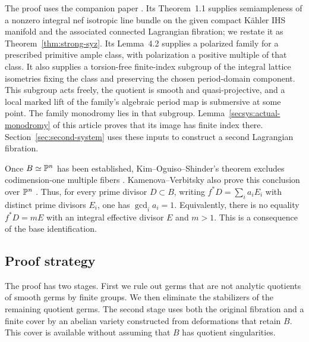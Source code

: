 The proof uses the companion paper \cite{StrongSYZ2026}.
Its Theorem~1.1 supplies semiampleness of a nonzero
integral nef isotropic line bundle on the given compact Kähler IHS manifold
and the associated connected Lagrangian fibration; we restate it as
Theorem~\ref{thm:strong-syz}. Its Lemma~4.2 supplies a polarized family for
a prescribed primitive ample class, with polarization a positive multiple
of that class. It also supplies a torsion-free finite-index subgroup of the
integral lattice isometries fixing the class and preserving the chosen
period-domain component. This subgroup acts freely, the quotient is smooth
and quasi-projective, and a local marked lift of the family's algebraic
period map is submersive at some point. The family monodromy lies in that subgroup.
Lemma~\ref{secsys:actual-monodromy} of this article proves that its image
has finite index there. Section~\ref{sec:second-system}
uses these inputs to construct a second Lagrangian fibration.

Once \(B\simeq\mathbb P^n\) has been established, Kim--Oguiso--Shinder's theorem
excludes codimension-one multiple fibers
\cite[Theorems~1.1 and~3.4]{KimOguisoShinder2026}. Kamenova--Verbitsky also
prove this conclusion over \(\mathbb P^n\)
\cite[Theorems~1.5 and~6.7]{KamenovaVerbitsky2026}. Thus, for every prime
divisor \(D\subset B\), writing \(f^*D=\sum_i a_iE_i\) with distinct prime
divisors \(E_i\), one has \(\gcd_i a_i=1\). Equivalently, there is no
equality \(f^*D=mE\) with an integral effective divisor \(E\) and \(m>1\).
This is a consequence of the base identification.

\subsection{Proof strategy}

The proof has two stages. First we rule out germs that are not analytic
quotients of smooth germs by finite groups. We then eliminate the
stabilizers of the remaining quotient germs. The second stage uses both
the original fibration and a finite cover by an abelian variety constructed
from deformations that retain \(B\). This cover is available without
assuming that \(B\) has quotient singularities.

